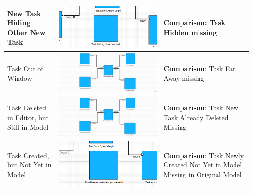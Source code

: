 \begin{longtable}{p{} >{\raggedright\arraybackslash}m{} >{\raggedright\arraybackslash}m{}}
    New Task Hiding Other New Task & \includegraphics[width=\linewidth]{pictures/61_task_hides_task_input_clip.png} & \textbf{Comparison}: Task Hidden missing \\
    \midrule
    Task Out of Window & \includegraphics[width=\linewidth]{pictures/63_task_far_away_input_clip.png} & \textbf{Comparison}: Task Far Away missing \\
    \midrule
    Task Deleted in Editor, but Still in Model & \includegraphics[width=\linewidth]{pictures/63_task_far_away_input_clip.png} & \textbf{Comparison}: Task New Task Already Deleted Missing \\
    \midrule
    Task Created, but Not Yet in Model & \includegraphics[width=\linewidth]{pictures/71_new_task_not_yet_in_model_input_clip.png} & \textbf{Comparison}: Task Newly Created Not Yet in Model Missing in Original Model \\

\end{longtable}
